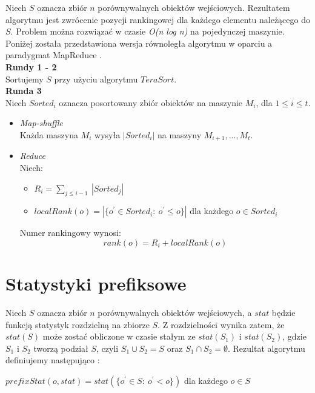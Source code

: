 \documentclass[licencjacka]{pracamgr}
\begin{document}
Niech \(S\) oznacza zbiór \(n\) porównywalnych obiektów wejściowych. Rezultatem algorytmu jest zwrócenie pozycji rankingowej dla każdego elementu należącego do \(S\). Problem można rozwiązać w czasie \textit{O(n log n)} na pojedynczej maszynie. Poniżej została przedstawiona wersja równoległa algorytmu w oparciu a paradygmat MapReduce \cite{tao2013minimal}. \\

\textbf{Rundy 1 - 2} \\
Sortujemy \(S\) przy użyciu algorytmu \(TeraSort\). \\

\textbf{Runda 3} \\
Niech \(Sorted_i\) oznacza posortowany zbiór obiektów na maszynie \(M_i\), dla \(1 \leq i \leq t\).
\begin{itemize}
    \item \textit{Map-shuffle} \\
    Każda maszyna \(M_i\) wysyła \(|Sorted_i|\) na maszyny \(M_{i+1}, ..., M_t\).
    \item \textit{Reduce} \\
    Niech:
    \begin{itemize}
        \item $R_i = \sum_{j \leq i-1} \ |Sorted_j|$
        \item \(localRank(o) = |\{o^\prime \in Sorted_i : \ o^\prime \leq o\}|\) dla każdego \(o \in Sorted_i\)
    \end{itemize}
    Numer rankingowy wynosi: \\
    
    $$rank(o) = R_i + localRank(o)$$
    
\end{itemize}

\section{Statystyki prefiksowe}
Niech \(S\) oznacza zbiór \(n\) porównywalnych obiektów wejściowych, a \(stat\) będzie funkcją statystyk rozdzielną na zbiorze \(S\). Z rozdzielności wynika zatem, że \(stat(S)\) może zostać obliczone w czasie stałym ze \(stat(S_1)\) i \(stat(S_2)\), gdzie \(S_1\) i \(S_2\) tworzą podział \(S\), czyli \(S_1 \cup S_2 = S\) oraz \(S_1 \cap S_2 = \emptyset\). Rezultat algorytmu definiujemy następująco \cite{tao2013minimal}:
\begin{center}
\(prefixStat(o, stat) = stat(\{o^\prime \in S: \ o^\prime < o\})\) dla każdego \(o \in S\) \\
\end{center}
\end{document}
